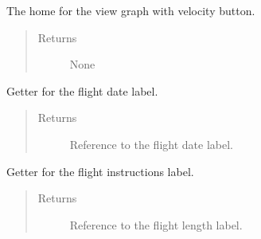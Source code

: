 \documentclass[letterpaper,10pt,english]{sphinxmanual}
\begin{document}
\begin{fulllineitems}
\begin{fulllineitems}
\begin{quote}
\begin{description}
\end{description}\end{quote}

\end{fulllineitems}


\begin{fulllineitems}
\label{\detokenize{index:src.Views.View_ReportScreen.ReportWindow.set_BtnViewGraphVelocity}}
The home for the view graph with velocity button.
\begin{quote}\begin{description}
\item[{Returns}] \leavevmode
None

\end{description}\end{quote}

\end{fulllineitems}


\begin{fulllineitems}
\label{\detokenize{index:src.Views.View_ReportScreen.ReportWindow.set_LblFlightDate}}
Getter for the flight date label.
\begin{quote}\begin{description}
\item[{Returns}] \leavevmode
Reference to the flight date label.

\end{description}\end{quote}

\end{fulllineitems}


\begin{fulllineitems}
\label{\detokenize{index:src.Views.View_ReportScreen.ReportWindow.set_LblFlightInstructions}}
Getter for the flight instructions label.
\begin{quote}\begin{description}
\item[{Returns}] \leavevmode
Reference to the flight length label.


\end{description}
\end{quote}
\end{fulllineitems}
\end{fulllineitems}
\end{document}
